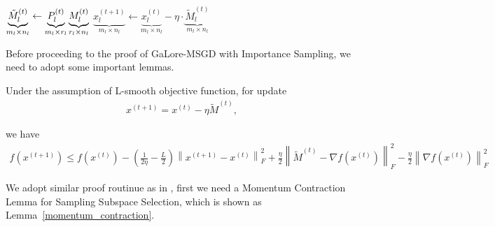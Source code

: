 \begin{algorithm*}[!ht]
\begin{algorithmic}[1]
   \STATE $\underbrace{\Tilde{M}_l^{(t)}}_{m_l\times n_l} \gets \underbrace{P_l^{(t)}}_{m_l \times r_l} \underbrace{M_l^{(t)}}_{r_l \times n_l}$ \hfill {}
   \STATE $\underbrace{x_l^{(t+1)}}_{m_l\times n_l} \gets \underbrace{x_l^{(t)}}_{m_l\times n_l} - \eta \cdot \underbrace{\tilde{M}_l^{(t)}}_{m_l\times n_l}$ \hfill {}

   \ENDFOR
   \ENDFOR
 \end{algorithmic}
\end{algorithm*}


Before proceeding to the proof of GaLore-MSGD with Importance Sampling, we need to adopt some important lemmas.

\begin{lemma} 
\label{descent lemma}

Under the assumption of L-smooth objective function, for update
\begin{align*}
    x^{(t+1)} = x^{(t)} - \eta \tilde{M}^{(t)},
\end{align*}

we have 
\begin{align*}
    f(x^{(t+1)}) \leq f(x^{(t)}) - \left(\frac{1}{2\eta}-\frac{L}{2} \right)\left \| x^{(t+1)}-x^{(t)} \right \|_F^2 +\frac{\eta}{2}\left \| \tilde{M}^{(t)}-\nabla f(x^{(t)})  \right \|_F^2 - \frac{\eta}{2}\left \| \nabla f(x^{(t)}) \right \|_F^2 
\end{align*}

    
\end{lemma}







We adopt similar proof routinue as in \cite{he2024subspace}, first we need a Momentum Contraction Lemma for Sampling Subspace Selection, which is shown as Lemma~\ref{momentum_contraction}.


